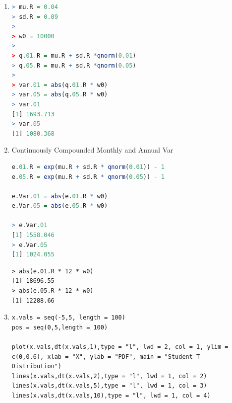 \documentclass[letterpaper,12pt]{article}
\begin{document}
\begin{enumerate}
\item 
\begin{lstlisting}[language = R]
> mu.R = 0.04
> sd.R = 0.09
> 
> w0 = 10000
> 
> q.01.R = mu.R + sd.R *qnorm(0.01)
> q.05.R = mu.R + sd.R *qnorm(0.05)
> 
> var.01 = abs(q.01.R * w0)
> var.05 = abs(q.05.R * w0)
> var.01
[1] 1693.713
> var.05
[1] 1080.368
\end{lstlisting}
\item Continuously Compounded Monthly and Annual Var
\begin{lstlisting}[language = R]
e.01.R = exp(mu.R + sd.R * qnorm(0.01)) - 1
e.05.R = exp(mu.R + sd.R * qnorm(0.05)) - 1

e.Var.01 = abs(e.01.R * w0)
e.Var.05 = abs(e.05.R * w0)

> e.Var.01
[1] 1558.046
> e.Var.05
[1] 1024.055
\end{lstlisting}

\begin{lstlisting}
> abs(e.01.R * 12 * w0)
[1] 18696.55
> abs(e.05.R * 12 * w0)
[1] 12288.66
\end{lstlisting}

\item \begin{lstlisting}
x.vals = seq(-5,5, length = 100)
pos = seq(0,5,length = 100)

plot(x.vals,dt(x.vals,1),type = "l", lwd = 2, col = 1, ylim = c(0,0.6), xlab = "X", ylab = "PDF", main = "Student T Distribution")
lines(x.vals,dt(x.vals,2),type = "l", lwd = 1, col = 2)
lines(x.vals,dt(x.vals,5),type = "l", lwd = 1, col = 3)
lines(x.vals,dt(x.vals,10),type = "l", lwd = 1, col = 4)


\end{lstlisting}
\end{enumerate}
\end{document}
